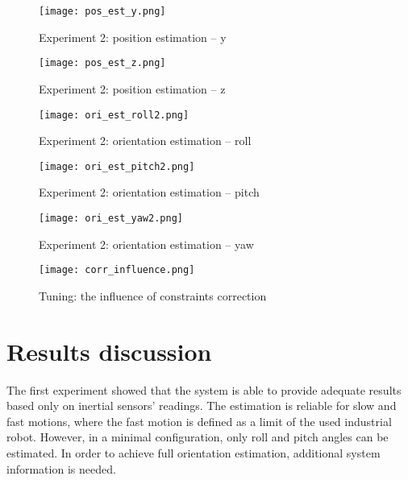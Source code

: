 \begin{figure}[p]
	\centering
	\texttt{[image: pos\_est\_y.png]}
	\caption{Experiment 2: position estimation -- y}
	\label{pos_est_y}
\end{figure}

\begin{figure}[p]
	\centering
	\texttt{[image: pos\_est\_z.png]}
	\caption{Experiment 2: position estimation -- z}
	\label{pos_est_z}
\end{figure}

\begin{figure}[p]
	\centering
	\texttt{[image: ori\_est\_roll2.png]}
	\caption{Experiment 2: orientation estimation -- roll}
	\label{ori_est_roll2}
\end{figure}

\begin{figure}[p]
	\centering
	\texttt{[image: ori\_est\_pitch2.png]}
	\caption{Experiment 2: orientation estimation -- pitch}
	\label{ori_est_pitch2}
\end{figure}


\begin{figure}[p]
	\centering
	\texttt{[image: ori\_est\_yaw2.png]}
	\caption{Experiment 2: orientation estimation -- yaw}
	\label{ori_est_yaw2}
\end{figure}


\begin{figure}[p]
	\centering
	\texttt{[image: corr\_influence.png]}
	\caption{Tuning: the influence of constraints correction}
	\label{corr_strength}
\end{figure}

\section{Results discussion}

The first experiment showed that the system is able to provide adequate results based only on inertial sensors' readings. The estimation is reliable for slow and fast motions, where the fast motion is defined as a limit of the used industrial robot. However, in a minimal configuration, only roll and pitch angles can be estimated. In order to achieve full orientation estimation, additional system information is needed.\\

